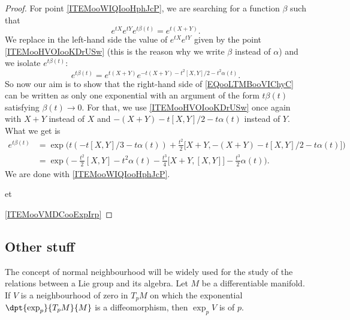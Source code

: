 \begin{proof}
    For point \ref{ITEMooWIQIooHphJcP}, we are searching for a function \( \beta\) such that 
    \begin{equation}
        e^{tX} e^{tY} e^{t\beta(t)}= e^{t(X+Y)}.
    \end{equation}
    We replace in the left-hand side the value of \(  e^{tX} e^{tY}\) given by the point \ref{ITEMooHVOIooKDrUSw} (this is the reason why we write \( \beta\) instead of \( \alpha\)) and we isolate \(  e^{t\beta(t)}\):
    \begin{equation}        \label{EQooLTMBooVIChyC}
        e^{t\beta(t)}= e^{t(X+Y)} e^{-t(X+Y)-t^2[X,Y]/2-t^2\alpha(t)}.
    \end{equation}
    So now our aim is to show that the right-hand side of \eqref{EQooLTMBooVIChyC} can be written as only one exponential with an argument of the form \( t\beta(t)\) satisfying \( \beta(t)\to 0\). For that, we use \ref{ITEMooHVOIooKDrUSw} once again with \( X+Y\) instead of \( X\) and \( -(X+Y)-t[X,Y]/2-t\alpha(t)\) instead of \( Y\). What we get is
    \begin{subequations}
        \begin{align}
            e^{t\beta(t)}&=\exp\big( t(-t[X,Y]/3-t\alpha(t))+\frac{ t^2 }{2}\big[ X+Y,-(X+Y)-t[X,Y]/2-t\alpha(t) \big] \big)\\
            &=\exp\big( -\frac{ t^2 }{2}[X,Y]  -t^2\alpha(t)-\frac{ t^3 }{ 4 }\big[ X+Y,[X,Y] \big]-\frac{ t^3 }{ 2 }\alpha(t)  \big).
        \end{align}
    \end{subequations}
    We are done with \ref{ITEMooWIQIooHphJcP}.
    

et

    \ref{ITEMooVMDCooExpIrp}

\end{proof}


\subsection{Other stuff}

The concept of normal neighbourhood will be widely used for the study of the relations between a Lie group and its algebra. Let $M$ be a differentiable manifold. If $V$ is a neighbourhood of zero in $T_pM$ on which the exponential $\dpt{\exp_p}{T_pM}{M}$ is a diffeomorphism, then $\exp_pV$ is   of $p$.

